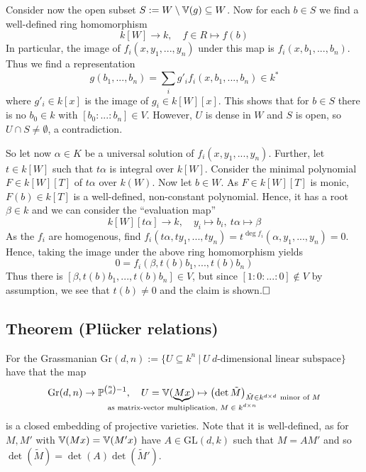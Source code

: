 Consider now the open subset $S := W \setminus \mathbb{V}(g) \subseteq W$.
Now for each $b \in S$ we find a well-defined ring homomorphism
\begin{equation*}
    k[W] \to k, \quad f \in R \mapsto f(b)
\end{equation*}
In particular, the image of $f_i(x, y_1, ..., y_n)$ under this map is $f_i(x, b_1, ..., b_n)$. 
Thus we find a representation
\begin{equation*}
    g(b_1, ..., b_n) = \sum_i g'_i f_i(x, b_1, ..., b_n) \in k^*
\end{equation*}
where $g'_i \in k[x]$ is the image of $g_i \in k[W][x]$.
This shows that for $b \in S$ there is no $b_0 \in k$ with $[b_0 : ... : b_n] \in V$.
However, $U$ is dense in $W$ and $S$ is open, so $U \cap S \neq \emptyset$, a contradiction.

So let now $\alpha \in K$ be a universal solution of $f_i(x, y_1, ..., y_n)$.
Further, let $t \in k[W]$ such that $t\alpha$ is integral over $k[W]$.
Consider the minimal polynomial $F \in k[W][T]$ of $t\alpha$ over $k(W)$.
Now let $b \in W$. As $F \in k[W][T]$ is monic, $F(b) \in k[T]$ is a well-defined, non-constant polynomial.
Hence, it has a root $\beta \in k$ and we can consider the ``evaluation map''
\begin{equation*}
    k[W][t\alpha] \to k, \quad y_i \mapsto b_i, \ t\alpha \mapsto \beta
\end{equation*}
As the $f_i$ are homogenous, find $f_i(t\alpha, ty_1, ..., ty_n) = t^{\deg f_i}(\alpha, y_1, ..., y_n) = 0$.
Hence, taking the image under the above ring homomorphism yields
\begin{equation*}
    0 = f_i(\beta, t(b) b_1, ..., t(b) b_n)
\end{equation*}
Thus there is $[\beta, t(b) b_1, ..., t(b) b_n] \in V$, but since $[1 : 0 : ... : 0] \notin V$ by assumption, we see that $t(b) \neq 0$ and the claim is shown.$\hfill\square$

\subsection{Theorem (Plücker relations)}
For the Grassmanian $\mathrm{Gr}(d, n) := \{ U \subseteq k^n \ | \ U \ \text{$d$-dimensional linear subspace}\}$ have that the map
\begin{equation*}
    \mathrm{Gr}(d, n) \to \mathbb{P}^{{n \choose d} - 1}, \quad U = \V(\underbrace{Mx}_{\mathclap{\text{as matrix-vector multiplication, $M \in k^{d \times n}$}}}) \mapsto \left( \det \tilde{M} \right)_{\tilde{M} \in k^{d \times d} \ \text{minor of $M$}}
\end{equation*}
is a closed embedding of projective varieties.
Note that it is well-defined, as for $M, M'$ with $\mathbb{V}(Mx) = \mathbb{V}(M'x)$ have $A \in \mathrm{GL}(d, k)$ such that $M = AM'$ and so $\det(\tilde{M}) = \det(A)\det(\tilde{M}')$. 

